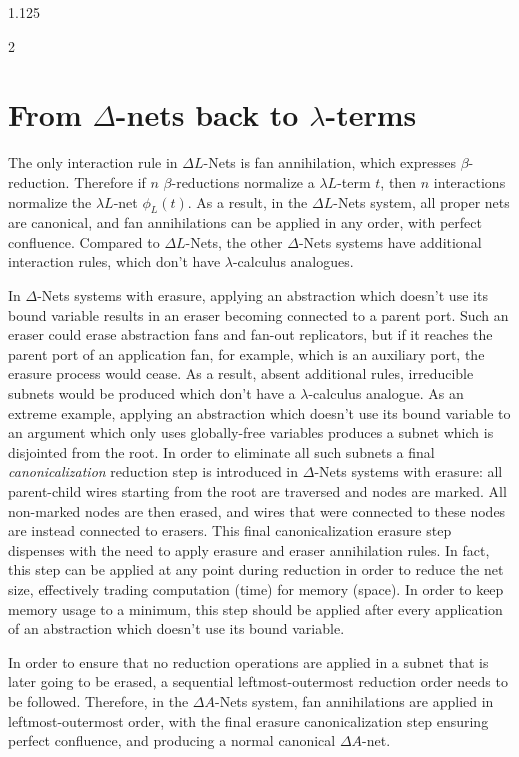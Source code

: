 \documentclass[10pt]{article}
\begin{document}
\begin{spacing}{1.125}
\begin{multicols}{2}
\section{From \mbox{$\Delta$-nets} back to \mbox{$\lambda$-terms}}

The only interaction rule in \mbox{$\Delta L$-Nets} is fan annihilation, which expresses \mbox{$\beta$-reduction}.
Therefore if $n$ \mbox{$\beta$-reductions} normalize a \mbox{$\lambda L$-term} $t$, then $n$ interactions normalize the \mbox{$\lambda L$-net} \mbox{$\phi_L(t)$}.
As a result, in the \mbox{$\Delta L$-Nets} system, all proper nets are canonical, and fan annihilations can be applied in any order, with perfect confluence. Compared to \mbox{$\Delta L$-Nets}, the other \mbox{$\Delta$-Nets} systems have additional interaction rules, which don't have \mbox{$\lambda$-calculus} analogues.

In \mbox{$\Delta $-Nets} systems with erasure, applying an abstraction which doesn't use its bound variable results in an eraser becoming connected to a parent port.
Such an eraser could erase abstraction fans and fan-out replicators, but if it reaches the parent port of an application fan, for example, which is an auxiliary port, the erasure process would cease.
As a result, absent additional rules, irreducible subnets would be produced which don't have a \mbox{$\lambda$-calculus} analogue.
As an extreme example, applying an abstraction which doesn't use its bound variable to an argument which only uses globally-free variables produces a subnet which is disjointed from the root.
In order to eliminate all such subnets a final \emph{canonicalization} reduction step is introduced in \mbox{$\Delta$-Nets} systems with erasure: all parent-child wires starting from the root are traversed and nodes are marked. All non-marked nodes are then erased, and wires that were connected to these nodes are instead connected to erasers.
This final canonicalization erasure step dispenses with the need to apply erasure and eraser annihilation rules.
In fact, this step can be applied at any point during reduction in order to reduce the net size, effectively trading computation (time) for memory (space). In order to keep memory usage to a minimum, this step should be applied after every application of an abstraction which doesn't use its bound variable.

In order to ensure that no reduction operations are applied in a subnet that is later going to be erased, a sequential leftmost-outermost reduction order needs to be followed.
Therefore, in the \mbox{$\Delta A$-Nets} system, fan annihilations are applied in leftmost-outermost order, with the final erasure canonicalization step ensuring perfect confluence, and producing a normal canonical \mbox{$\Delta A$-net}.


\end{multicols}
\end{spacing}
\end{document}
